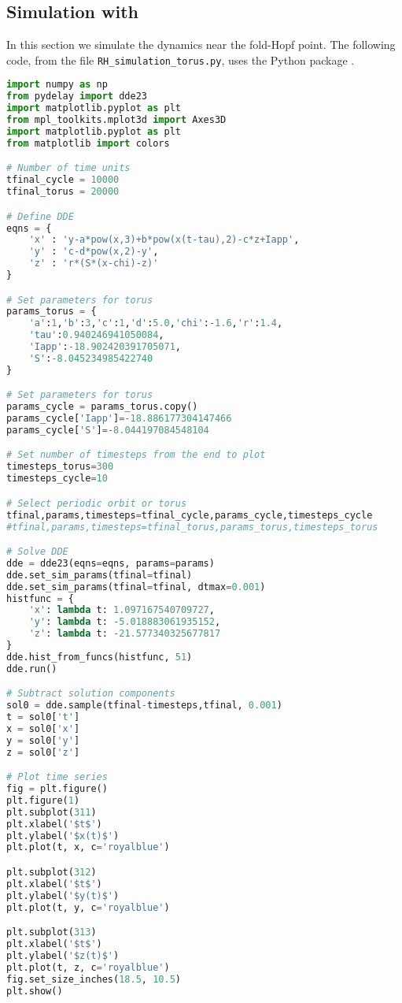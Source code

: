 \subsection{Simulation with \PYDELAY}
\label{switch:SM:sec:RH:simulation}
In this section we simulate the dynamics near the fold-Hopf point. The following code, from the file \lstinline|RH_simulation_torus.py|, uses the Python package \PYDELAY \cite{Flunkert2009Flunkert}.
\begin{lstlisting}[language=Python,escapechar=!]
import numpy as np
from pydelay import dde23
import matplotlib.pyplot as plt
from mpl_toolkits.mplot3d import Axes3D
import matplotlib.pyplot as plt
from matplotlib import colors

# Number of time units
tfinal_cycle = 10000
tfinal_torus = 20000

# Define DDE
eqns = {
    'x' : 'y-a*pow(x,3)+b*pow(x(t-tau),2)-c*z+Iapp',
    'y' : 'c-d*pow(x,2)-y',
    'z' : 'r*(S*(x-chi)-z)'
}

# Set parameters for torus
params_torus = {
    'a':1,'b':3,'c':1,'d':5.0,'chi':-1.6,'r':1.4,
    'tau':0.940246941050084,
    'Iapp':-18.902420391705071,
    'S':-8.045234985422740
}

# Set parameters for torus
params_cycle = params_torus.copy()
params_cycle['Iapp']=-18.886177304147466
params_cycle['S']=-8.044197084548104

# Set number of timesteps from the end to plot
timesteps_torus=300
timesteps_cycle=10

# Select periodic orbit or torus
tfinal,params,timesteps=tfinal_cycle,params_cycle,timesteps_cycle
#tfinal,params,timesteps=tfinal_torus,params_torus,timesteps_torus

# Solve DDE
dde = dde23(eqns=eqns, params=params)
dde.set_sim_params(tfinal=tfinal)
dde.set_sim_params(tfinal=tfinal, dtmax=0.001)
histfunc = {
    'x': lambda t: 1.097167540709727, 
    'y': lambda t: -5.018883061935152,
    'z': lambda t: -21.577340325677817
}
dde.hist_from_funcs(histfunc, 51)
dde.run()

# Subtract solution components
sol0 = dde.sample(tfinal-timesteps,tfinal, 0.001)
t = sol0['t']
x = sol0['x']
y = sol0['y']
z = sol0['z']

# Plot time series
fig = plt.figure()
plt.figure(1)
plt.subplot(311)
plt.xlabel('$t$')
plt.ylabel('$x(t)$')
plt.plot(t, x, c='royalblue')

plt.subplot(312)
plt.xlabel('$t$')
plt.ylabel('$y(t)$')
plt.plot(t, y, c='royalblue')

plt.subplot(313)
plt.xlabel('$t$')
plt.ylabel('$z(t)$')
plt.plot(t, z, c='royalblue')
fig.set_size_inches(18.5, 10.5)
plt.show()


\end{lstlisting}
